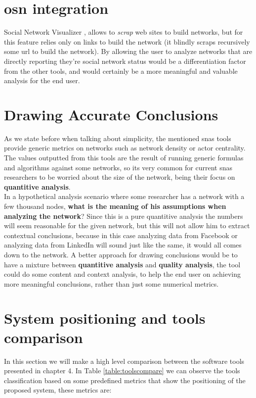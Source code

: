 \section{\acrfull{osn} integration}
Social Network Visualizer \citep{socnetv}, allows to \textit{scrap} web sites to build networks, but for this feature relies only on links to build the network (it blindly scraps recursively some url to build the network). By allowing the user to analyze networks that are directly reporting they're social network status would be a differentiation factor from the other tools, and would certainly be a more meaningful and valuable analysis for the end user.

\section{Drawing Accurate Conclusions}
As we state before when talking about simplicity, the mentioned \glspl{sna} tools provide generic metrics on networks such as network density or actor centrality. The values outputted from this tools are the result of running generic formulas and algorithms against some networks, so its very common for current \glspl{sna} researchers to be worried about the size of the network, being their focus on \textbf{quantitive analysis}.\\
\indent In a hypothetical analysis scenario where some researcher has a network with a few thousand nodes, \textbf{what is the meaning of his assumptions when analyzing the network}? Since this is a pure quantitive analysis the numbers will seem reasonable for the given network, but this will not allow him to extract contextual conclusions, because in this case analyzing data from Facebook or analyzing data from LinkedIn will sound just like the same, it would all comes down to the network. A better approach for drawing conclusions would be to have a mixture between \textbf{quantitive analysis} and \textbf{quality analysis}, the tool could do some content and context analysis, to help the end user on achieving more meaningful conclusions, rather than just some numerical metrics.

\section{System positioning and tools comparison}
In this section we will make a high level comparison between the software tools presented in chapter 4. In Table \ref{table:toolscompare} we can observe the tools classification based on some predefined metrics that show the positioning of the proposed system, these metrics are:

